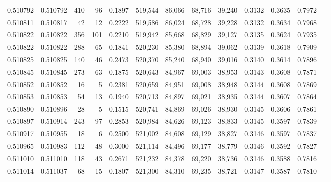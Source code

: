 \begin{tabular}{rrrrrrrrrrrrr}
0.510792 & 0.510792 &   410 &    96 &                                     0.1897 & 519,544 &  86,066 &  68,716 &  39,240 & 0.3132 & 0.3635 & 0.7972 \\
0.510811 & 0.510817 &    42 &    12 &                                     0.2222 & 519,586 &  86,024 &  68,728 &  39,228 & 0.3132 & 0.3634 & 0.7968 \\
0.510822 & 0.510822 &   356 &   101 &                                     0.2210 & 519,942 &  85,668 &  68,829 &  39,127 & 0.3135 & 0.3624 & 0.7935 \\
0.510822 & 0.510822 &   288 &    65 &                                     0.1841 & 520,230 &  85,380 &  68,894 &  39,062 & 0.3139 & 0.3618 & 0.7909 \\
0.510825 & 0.510825 &   140 &    46 &                                     0.2473 & 520,370 &  85,240 &  68,940 &  39,016 & 0.3140 & 0.3614 & 0.7896 \\
0.510845 & 0.510845 &   273 &    63 &                                     0.1875 & 520,643 &  84,967 &  69,003 &  38,953 & 0.3143 & 0.3608 & 0.7871 \\
0.510852 & 0.510852 &    16 &     5 &                                     0.2381 & 520,659 &  84,951 &  69,008 &  38,948 & 0.3144 & 0.3608 & 0.7869 \\
0.510853 & 0.510853 &    54 &    13 &                                     0.1940 & 520,713 &  84,897 &  69,021 &  38,935 & 0.3144 & 0.3607 & 0.7864 \\
0.510890 & 0.510896 &    28 &     5 &                                     0.1515 & 520,741 &  84,869 &  69,026 &  38,930 & 0.3145 & 0.3606 & 0.7861 \\
0.510897 & 0.510914 &   243 &    97 &                                     0.2853 & 520,984 &  84,626 &  69,123 &  38,833 & 0.3145 & 0.3597 & 0.7839 \\
0.510917 & 0.510955 &    18 &     6 &                                     0.2500 & 521,002 &  84,608 &  69,129 &  38,827 & 0.3146 & 0.3597 & 0.7837 \\
0.510965 & 0.510983 &   112 &    48 &                                     0.3000 & 521,114 &  84,496 &  69,177 &  38,779 & 0.3146 & 0.3592 & 0.7827 \\
0.511010 & 0.511010 &   118 &    43 &                                     0.2671 & 521,232 &  84,378 &  69,220 &  38,736 & 0.3146 & 0.3588 & 0.7816 \\
0.511014 & 0.511037 &    68 &    15 &                                     0.1807 & 521,300 &  84,310 &  69,235 &  38,721 & 0.3147 & 0.3587 & 0.7810 \\

\end{tabular}
